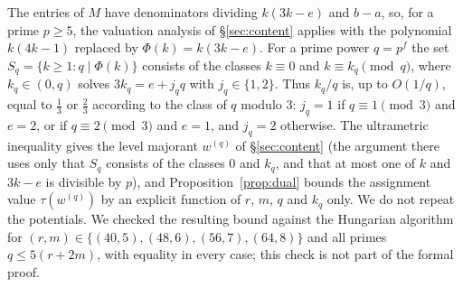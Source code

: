 The entries of $M$ have denominators dividing $k(3k-e)$ and $b-a$, so, for a prime $p\ge5$, the valuation analysis of
\S\ref{sec:content} applies with the polynomial $k(4k-1)$ replaced by $\Phi(k)=k(3k-e)$. For a prime power $q=p^f$
the set $S_q=\{k\ge1:q\mid\Phi(k)\}$ consists of the classes $k\equiv0$ and $k\equiv k_q\pmod q$, where $k_q\in(0,q)$ solves
$3k_q=e+j_qq$ with $j_q\in\{1,2\}$. Thus $k_q/q$ is, up to $O(1/q)$, equal to $\frac13$ or $\frac23$ according to the class
of $q$ modulo $3$: $j_q=1$ if $q\equiv1\pmod3$ and $e=2$, or if $q\equiv2\pmod3$ and $e=1$, and $j_q=2$ otherwise.
The ultrametric inequality gives the level majorant $w^{(q)}$ of \S\ref{sec:content} (the argument there uses only that
$S_q$ consists of the classes $0$ and $k_q$, and that at most one of $k$ and $3k-e$ is divisible by $p$),
and Proposition~\ref{prop:dual} bounds the assignment value $\tau(w^{(q)})$ by an explicit function of $r$, $m$, $q$ and $k_q$ only. We
do not repeat the potentials. We checked the resulting bound against the Hungarian algorithm for $(r,m)\in\{(40,5),(48,6),(56,7),(64,8)\}$ and all
primes $q\le5(r+2m)$, with equality in every case; this check is not part of the formal proof.

